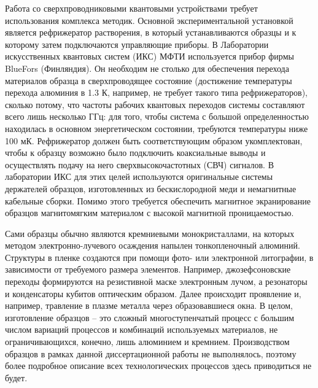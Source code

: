 \documentclass[14pt, a4paper]{extreport}
\numberwithin{equation}{section}
\begin{document}
Работа со сверхпроводниковыми квантовыми устройствами требует использования комплекса методик. Основной экспериментальной установкой является рефрижератор растворения, в который устанавливаются образцы и к которому затем подключаются управляющие приборы. В Лаборатории искусственных квантовых систем (ИКС) МФТИ используется прибор фирмы BlueFors (Финляндия). Он необходим не столько для обеспечения перехода материалов образца в сверхпроводящее состояние (достижение температуры перехода алюминия в 1.3 К, например, не требует такого типа рефрижераторов), сколько потому, что частоты рабочих квантовых переходов системы составляют всего лишь несколько ГГц: для того, чтобы система с большой определенностью находилась в  основном энергетическом состоянии, требуются температуры ниже 100 мК. Рефрижератор должен быть соответствующим образом укомплектован, чтобы к образцу возможно было подключить коаксиальные выводы и осуществлять подачу на него сверхвысокочастотных (СВЧ) сигналов. В лаборатории ИКС для этих целей используются оригинальные системы держателей образцов, изготовленных из бескислородной меди и немагнитные кабельные сборки. Помимо этого требуется обеспечить магнитное экранирование образцов магнитомягким материалом с высокой магнитной проницаемостью.

Сами образцы обычно являются кремниевыми монокристаллами, на которых методом электронно-лучевого осаждения напылен тонкопленочный алюминий. Структуры в пленке создаются при помощи фото- или электронной литографии, в зависимости от требуемого размера элементов. Например, джозефсоновские переходы формируются на резистивной маске электронным лучом, а резонаторы и конденсаторы кубитов оптическим образом. Далее происходит проявление и, например, травление в плазме металла через образовавшиеся окна. В целом, изготовление образцов -- это сложный многоступенчатый процесс с большим числом вариаций процессов и комбинаций используемых материалов, не ограничивающихся, конечно, лишь алюминием и кремнием.  Производством образцов в рамках данной диссертационной работы не выполнялось, поэтому более подробное описание всех технологических процессов здесь приводиться не будет.
\end{document}
